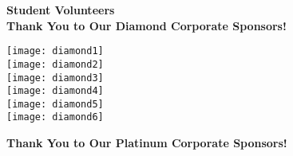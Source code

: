 \documentclass[twoside]{article}
\begin{document}
    { \fontsize{14}{17}\selectfont \bf Student Volunteers}\\\newpage
    \notepages
    { \fontsize{16}{19}\selectfont \bf Thank You to Our Diamond Corporate Sponsors!}\\
    \begin{center}\vspace{-1em}
    \begin{adjustbox}{max size={0.7\textwidth}{!}}\texttt{[image: diamond1]}\end{adjustbox}\vspace{1em}\\
        \begin{adjustbox}{max size={0.7\textwidth}{!}}\texttt{[image: diamond2]}\end{adjustbox}\vspace{1em}\\
        \begin{adjustbox}{max size={0.7\textwidth}{!}}\texttt{[image: diamond3]}\end{adjustbox}\vspace{1em}\\
        \begin{adjustbox}{max size={0.7\textwidth}{!}}\texttt{[image: diamond4]}\end{adjustbox}\vspace{1em}\\
        \begin{adjustbox}{max size={0.7\textwidth}{!}}\texttt{[image: diamond5]}\end{adjustbox}\vspace{1em}\\
        \begin{adjustbox}{max size={0.7\textwidth}{!}}\texttt{[image: diamond6]}\end{adjustbox}\vspace{1em}\\
        \end{center}
    \newpage
    { \fontsize{16}{19}\selectfont \bf Thank You to Our Platinum Corporate Sponsors!}
\end{document}
